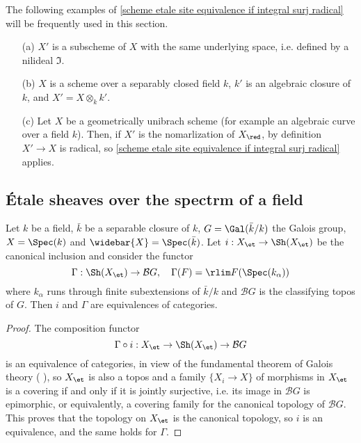 \begin{example}\label{scheme etale integral surj radical eg}
The following examples of \cref{scheme etale site equivalence if integral surj radical} will be frequently used in this section.
\begin{enumerate}
    \item[(a)] $X'$ is a subscheme of $X$ with the same underlying space, i.e. defined by a nilideal $\mathfrak{I}$.
    \item[(b)] $X$ is a scheme over a separably closed field $k$, $k'$ is an algebraic closure of $k$, and $X'=X\otimes_kk'$.
    \item[(c)] Let $X$ be a geometrically unibrach scheme (for example an algebraic curve over a field $k$). Then, if $X'$ is the nomarlization of $X_\red$, by definition $X'\to X$ is radical, so \cref{scheme etale site equivalence if integral surj radical} applies. 
\end{enumerate}
\end{example}

\subsection{\'Etale sheaves over the spectrm of a field}
\begin{proposition}\label{scheme etale topos of field equivalent to pi-set}
Let $k$ be a field, $\bar{k}$ be a separable closure of $k$, $G=\Gal(\bar{k}/k)$ the Galois group, $X=\Spec(k)$ and $\widebar{X}=\Spec(\bar{k})$. Let $i:X_\et\to\Sh(X_\et)$ be the canonical inclusion and consider the functor
\[\Gamma:\Sh(X_\et)\to \mathcal{B}G,\quad \Gamma(F)=\rlim F(\Spec(k_\alpha))\]
where $k_\alpha$ runs through finite subextensions of $\bar{k}/k$ and $\mathcal{B}G$ is the classifying topos of $G$. Then $i$ and $\Gamma$ are equivalences of categories.
\end{proposition}
\begin{proof}
The composition functor
\[\Gamma\circ i:X_\et\to\Sh(X_\et)\to \mathcal{B}G\]
is an equivalence of categories, in view of the fundamental theorem of Galois theory (\cite{SGA1} ), so $X_\et$ is also a topos and a family $\{X_i\to X\}$ of morphisms in $X_\et$ is a covering if and only if it is jointly surjective, i.e. its image in $\mathcal{B}G$ is epimorphic, or equivalently, a covering family for the canonical topology of $\mathcal{B}G$. This proves that the topology on $X_\et$ is the canonical topology, so $i$ is an equivalence, and the same holds for $\Gamma$.
\end{proof}

